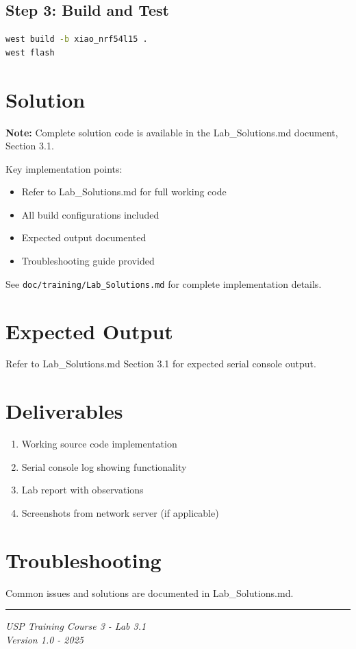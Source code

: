\documentclass[11pt,a4paper]{article}
\begin{document}
\subsection{Step 3: Build and Test}
\begin{lstlisting}[language=bash]
west build -b xiao_nrf54l15 .
west flash
\end{lstlisting}

\section{Solution}

\begin{solutionbox}
\textbf{Note:} Complete solution code is available in the Lab\_Solutions.md document, Section 3.1.

Key implementation points:
\begin{itemize}
    \item Refer to Lab\_Solutions.md for full working code
    \item All build configurations included
    \item Expected output documented
    \item Troubleshooting guide provided
\end{itemize}

See \texttt{doc/training/Lab\_Solutions.md} for complete implementation details.
\end{solutionbox}

\section{Expected Output}

Refer to Lab\_Solutions.md Section 3.1 for expected serial console output.

\section{Deliverables}

\begin{enumerate}[itemsep=10pt]
    \item Working source code implementation
    \item Serial console log showing functionality
    \item Lab report with observations
    \item Screenshots from network server (if applicable)
\end{enumerate}

\section{Troubleshooting}

Common issues and solutions are documented in Lab\_Solutions.md.

\vfill
\noindent\rule{\textwidth}{0.4pt}
\begin{center}
\textit{USP Training Course 3 - Lab 3.1}\\
\textit{Version 1.0 - 2025}
\end{center}
\end{document}
